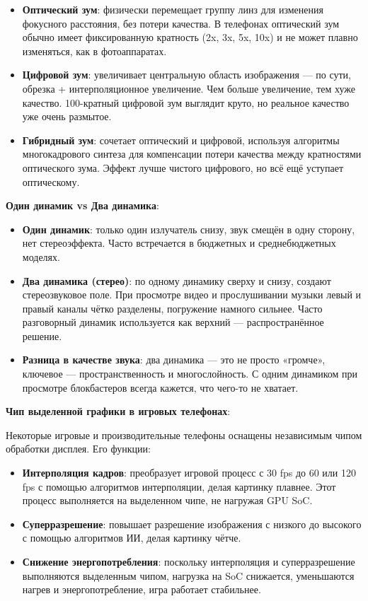 \begin{itemize}
  \item \textbf{Оптический зум}: физически перемещает группу линз для изменения фокусного расстояния, без потери качества. В телефонах оптический зум обычно имеет фиксированную кратность (2x, 3x, 5x, 10x) и не может плавно изменяться, как в фотоаппаратах.
  \item \textbf{Цифровой зум}: увеличивает центральную область изображения — по сути, обрезка + интерполяционное увеличение. Чем больше увеличение, тем хуже качество. 100-кратный цифровой зум выглядит круто, но реальное качество уже очень размытое.
  \item \textbf{Гибридный зум}: сочетает оптический и цифровой, используя алгоритмы многокадрового синтеза для компенсации потери качества между кратностями оптического зума. Эффект лучше чистого цифрового, но всё ещё уступает оптическому.
\end{itemize}


\textbf{Один динамик vs Два динамика}:

\begin{itemize}
  \item \textbf{Один динамик}: только один излучатель снизу, звук смещён в одну сторону, нет стереоэффекта. Часто встречается в бюджетных и среднебюджетных моделях.
  \item \textbf{Два динамика (стерео)}: по одному динамику сверху и снизу, создают стереозвуковое поле. При просмотре видео и прослушивании музыки левый и правый каналы чётко разделены, погружение намного сильнее. Часто разговорный динамик используется как верхний — распространённое решение.
  \item \textbf{Разница в качестве звука}: два динамика — это не просто «громче», ключевое — пространственность и многослойность. С одним динамиком при просмотре блокбастеров всегда кажется, что чего-то не хватает.
\end{itemize}

\textbf{Чип выделенной графики в игровых телефонах}:

Некоторые игровые и производительные телефоны оснащены независимым чипом обработки дисплея. Его функции:

\begin{itemize}
  \item \textbf{Интерполяция кадров}: преобразует игровой процесс с 30 fps до 60 или 120 fps с помощью алгоритмов интерполяции, делая картинку плавнее. Этот процесс выполняется на выделенном чипе, не нагружая GPU SoC.
  \item \textbf{Суперразрешение}: повышает разрешение изображения с низкого до высокого с помощью алгоритмов ИИ, делая картинку чётче.
  \item \textbf{Снижение энергопотребления}: поскольку интерполяция и суперразрешение выполняются выделенным чипом, нагрузка на SoC снижается, уменьшаются нагрев и энергопотребление, игра работает стабильнее.
\end{itemize}

